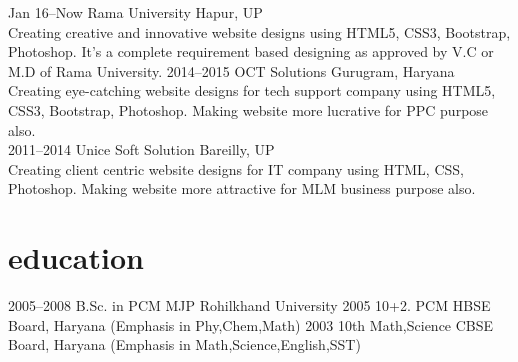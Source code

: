 \documentclass[]{cv-style}          %
\begin{document}
\begin{entrylist}
\entry
  {Jan 16--Now}
  {Rama University}
  {Hapur, UP}
  {\\
  Creating creative and innovative website designs using HTML5, CSS3, Bootstrap, Photoshop. It's a complete requirement based designing as approved by V.C or M.D of Rama University.}
\entry
  {2014--2015}
  {OCT Solutions}
  {Gurugram, Haryana}
  {\\
  Creating eye-catching website designs for tech support company using HTML5, CSS3, Bootstrap, Photoshop. Making website more lucrative for PPC purpose also.\\
  }
\entry
  {2011--2014}
  {Unice Soft Solution}
  {Bareilly, UP}
  {\\
  Creating client centric website designs for IT company using HTML, CSS,  Photoshop. Making website more attractive for MLM business purpose also.\\
  }


\end{entrylist}


\section{education}

\begin{entrylist}
\entry
{2005--2008}
{B.Sc. {\normalfont in PCM }}
{MJP Rohilkhand University}
{\vspace{-0.3cm}}
\entry
{2005}
{10+2. {\normalfont PCM}}
{HBSE Board, Haryana}
{(Emphasis in Phy,Chem,Math)}
\entry
{2003}
{10th {\normalfont Math,Science}}
{CBSE Board, Haryana}
{(Emphasis in Math,Science,English,SST)}
\end{entrylist}
\end{document}
